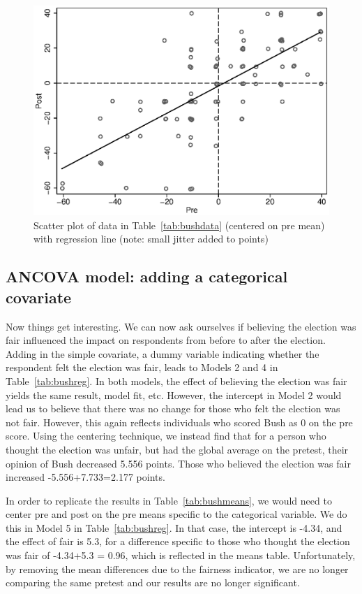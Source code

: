 \begin{figure}
   \centering
   \includegraphics[angle=0,
           width=.75\textwidth]{bushscatterc.eps}
   \caption{Scatter plot of data in Table~\ref{tab:bushdata} (centered on pre mean) with regression line (note: small jitter added to points)}
  \label{fig:bushscatterc}
\end{figure}

\subsection{ANCOVA model: adding a categorical covariate}

Now things get interesting. We can now ask ourselves if believing the election was fair influenced the impact on respondents from before to after the election. Adding in the simple covariate, a dummy variable indicating whether the respondent felt the election was fair, leads to Models 2 and 4 in Table~\ref{tab:bushreg}. In both models, the effect of believing the election was fair yields the same result, model fit, etc. However, the intercept in Model 2 would lead us to believe that there was no change for those who felt the election was not fair. However, this again reflects individuals who scored Bush as 0 on the pre score. Using the centering technique, we instead find that for a person who thought the election was unfair, but had the global average on the pretest, their opinion of Bush decreased 5.556 points. Those who believed the election was fair increased -5.556+7.733=2.177 points.

In order to replicate the results in Table~\ref{tab:bushmeans}, we would need to center pre and post on the pre means specific to the categorical variable. We do this in Model 5 in Table~\ref{tab:bushreg}. In that case, the intercept is -4.34, and the effect of fair is 5.3, for a difference specific to those who thought the election was fair of -4.34+5.3 = 0.96, which is reflected in the means table. Unfortunately, by removing the mean differences due to the fairness indicator, we are no longer comparing the same pretest and our results are no longer significant.

